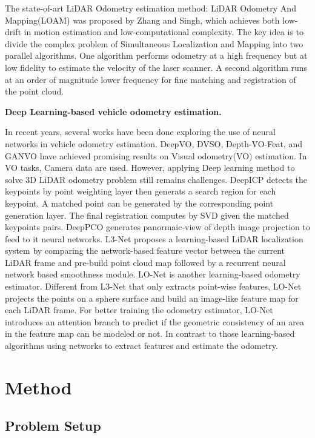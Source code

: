 \documentclass[sigconf]{acmart}
\newcommand{\bfsection}[1]{\vspace*{0.1cm}\noindent\textbf{#1.}}
\begin{document}
The state-of-art LiDAR Odometry estimation method: LiDAR Odometry And Mapping(LOAM)\cite{LOAM} was proposed by Zhang and Singh, which achieves both low-drift in motion estimation and low-computational complexity. The key idea is to divide the complex problem of Simultaneous Localization and Mapping into two parallel algorithms. One algorithm performs odometry at a high frequency but at low fidelity to estimate the velocity of the laser scanner. A second algorithm runs at an order of magnitude lower frequency for fine matching and registration of the point cloud.


\bfsection{Deep Learning-based vehicle odometry estimation}

In recent years, several works have been done exploring the use of neural networks in vehicle odometry estimation. DeepVO\cite{DeepVO}, DVSO\cite{DVSO}, Depth-VO-Feat\cite{Depth-VO-Feat}, and GANVO\cite{GANVO} have achieved promising results on Visual odometry(VO) estimation. In VO tasks, Camera data are used. However, applying Deep learning method to solve 3D LiDAR odometry problem still remains challenges. DeepICP\cite{Deep_icp} detects the keypoints by point weighting layer then generats a search region for each keypoint. A matched point can be generated by the corresponding point generation layer. The final registration computes by SVD given the matched keypoints pairs. DeepPCO\cite{DeepPCO} generates panormaic-view of depth image projection to feed to it neural networks. L3-Net \cite{lu2019l3} proposes a learning-based LiDAR localization system by comparing the network-based feature vector between the current LiDAR frame and pre-build point cloud map followed by a recurrent neural network based smoothness module. LO-Net\cite{LO-Net} is another learning-based odometry estimator. Different from L3-Net that only extracts point-wise features, LO-Net  projects the points on a sphere surface and build an image-like feature map for each LiDAR frame. For better training the odometry estimator, LO-Net introduces an attention branch to predict if the geometric consistency of an area in the feature map can be modeled or not. In contrast to those learning-based algorithms using networks to extract features and estimate the odometry. 

\section{Method}
\subsection{Problem Setup}
\end{document}
